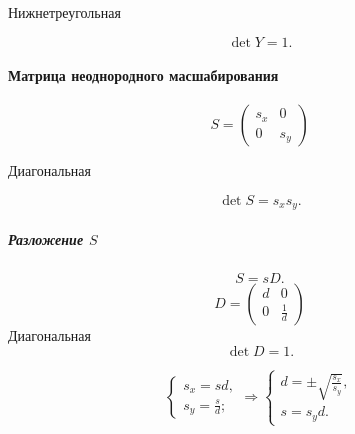 Нижнетреугольная

$$\det Y = 1.$$

\paragraph{Матрица неоднородного масшабирования}
$$S=
\begin{pmatrix}
	s_x & 0 \\
	0 & s_y
\end{pmatrix}
$$

Диагональная

$$\det S = s_x s_y.$$

\subparagraph{Разложение $S$}

$$S = sD.$$
$$D = \begin{pmatrix}
	d & 0\\
	0 & \frac{1}{d}
\end{pmatrix}$$
Диагональная
$$\det D = 1.$$

$$\begin{cases}
	s_x = sd,\\
	s_y = \frac{s}{d};
\end{cases}
\Rightarrow
\begin{cases}
	d = \pm \sqrt{\frac{s_x}{s_y}},\\
	s = s_y d.
\end{cases}
$$

